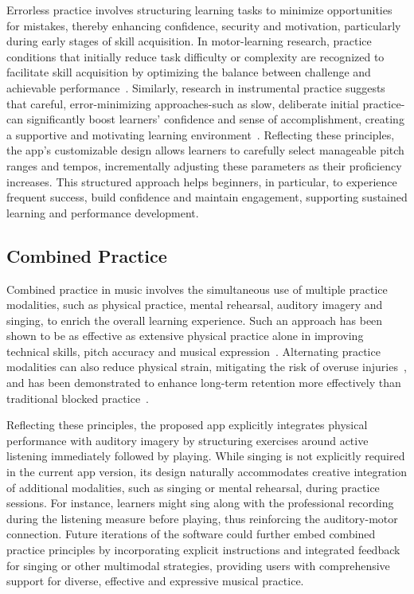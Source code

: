 \documentclass[runningheads]{llncs}
\begin{document}
Errorless practice involves structuring learning tasks to minimize opportunities for mistakes, thereby enhancing confidence, security and motivation, particularly during early stages of skill acquisition. In motor-learning research, practice conditions that initially reduce task difficulty or complexity are recognized to facilitate skill acquisition by optimizing the balance between challenge and achievable performance~\cite{Guadagnoli04}. Similarly, research in instrumental practice suggests that careful, error-minimizing approaches-such as slow, deliberate initial practice-can significantly boost learners’ confidence and sense of accomplishment, creating a supportive and motivating learning environment~\cite{Allingham23}. Reflecting these principles, the app’s customizable design allows learners to carefully select manageable pitch ranges and tempos, incrementally adjusting these parameters as their proficiency increases. This structured approach helps beginners, in particular, to experience frequent success, build confidence and maintain engagement, supporting sustained learning and performance development.


\subsection{Combined Practice}

Combined practice in music involves the simultaneous use of multiple practice modalities, such as physical practice, mental rehearsal, auditory imagery and singing, to enrich the overall learning experience. Such an approach has been shown to be as effective as extensive physical practice alone in improving technical skills, pitch accuracy and musical expression~\cite{Steen21}. Alternating practice modalities can also reduce physical strain, mitigating the risk of overuse injuries~\cite{Hagglund96}, and has been demonstrated to enhance long-term retention more effectively than traditional blocked practice~\cite{Vera08}.

Reflecting these principles, the proposed app explicitly integrates physical performance with auditory imagery by structuring exercises around active listening immediately followed by playing. While singing is not explicitly required in the current app version, its design naturally accommodates creative integration of additional modalities, such as singing or mental rehearsal, during practice sessions. For instance, learners might sing along with the professional recording during the listening measure before playing, thus reinforcing the auditory-motor connection. Future iterations of the software could further embed combined practice principles by incorporating explicit instructions and integrated feedback for singing or other multimodal strategies, providing users with comprehensive support for diverse, effective and expressive musical practice.
\end{document}
